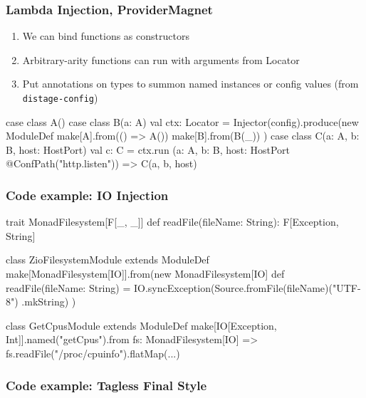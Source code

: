 \documentclass[usenames,dvipsnames]{beamer}
\begin{document}
\begin{frame}[fragile]
\frametitle{Lambda Injection, ProviderMagnet}
\begin{enumerate}
\item We can bind functions as constructors
\item Arbitrary-arity functions can run with arguments from Locator
\item Put annotations on types to summon named instances or config values (from \texttt{distage-config})
\end{enumerate}
\begin{scalacode}
case class A()
case class B(a: A)
val ctx: Locator = Injector(config).produce(new ModuleDef { 
  make[A].from(() => A())
  make[B].from(B(_))
})
case class C(a: A, b: B, host: HostPort)
val c: C = ctx.run {
  (a: A, b: B, host: HostPort @ConfPath("http.listen")) =>
    C(a, b, host)
}
\end{scalacode}
\end{frame}

\begin{frame}[fragile]
\frametitle{Code example: IO Injection}
\begin{enumerate}
\begin{scalacode}
trait MonadFilesystem[F[_, _]] {
  def readFile(fileName: String): F[Exception, String]
}

class ZioFilesystemModule extends ModuleDef {
  make[MonadFilesystem[IO]].from(new MonadFilesystem[IO] {
    def readFile(fileName: String) = 
      IO.syncException(Source.fromFile(fileName)("UTF-8")
        .mkString) 
  })
}

class GetCpusModule extends ModuleDef {
  make[IO[Exception, Int]].named("getCpus").from {
    fs: MonadFilesystem[IO] =>
      fs.readFile("/proc/cpuinfo").flatMap(...)
  }
}
\end{scalacode}
\end{enumerate}
\end{frame}

\begin{frame}[fragile]
\frametitle{Code example: Tagless Final Style}
\begin{enumerate}


\end{enumerate}
\end{frame}
\end{document}
